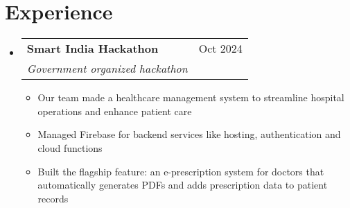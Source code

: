 \documentclass[letterpaper,11pt]{article}
\makeatletter
\newcommand{\resumeItem}[1]{
\item\small{
{#1 \vspace{-5pt}}
}
}
\newcommand{\resumeSubheading}[4]{
\vspace{-2pt}\item
\begin{tabular*}{0.97\textwidth}[t]{l@{\extracolsep{\fill}}r}
\textbf{#1} & #2 \\
\textit{\small#3} & \textit{\small #4} \\
\end{tabular*}\vspace{-7pt}
}
\newcommand{\resumeSubHeadingListStart}{\begin{itemize}[leftmargin=0.15in, label={}]}
\newcommand{\resumeSubHeadingListEnd}{\end{itemize}}
\newcommand{\resumeItemListStart}{\begin{itemize}}
\newcommand{\resumeItemListEnd}{\end{itemize}\vspace{3pt}}
\makeatother
\begin{document}
\section{Experience}
\resumeSubHeadingListStart

\begin{comment}
\resumeSubheading
{Internlay}{Nov 2024}
{College competition}{}
\resumeItemListStart
\resumeItem{Our team aimed to create an all-in-one solution for the management and coordination of various aspects of college sports}
\resumeItem{Implemented user authentication, ensuring that only organization users could sign in and access the system}
\resumeItem{Collaborated with team to implement various API routes for core functionality, such as managing sports events and scheduling}
\resumeItemListEnd
\end{comment}

\resumeSubheading
{Smart India Hackathon}{Oct 2024}
{Government organized hackathon}{}
\resumeItemListStart
\resumeItem{Our team made a healthcare management system to streamline hospital operations and enhance patient care}
\resumeItem{Managed Firebase for backend services like hosting, authentication and cloud functions}
\resumeItem{Built the flagship feature: an e-prescription system for doctors that automatically generates PDFs and adds prescription data to patient records}
\resumeItemListEnd

\resumeSubHeadingListEnd


\end{document}
